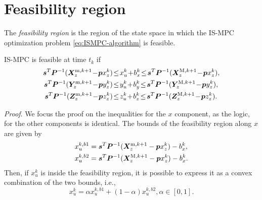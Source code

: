 \section{Feasibility region}

The {\em feasibility region} is the region of the state space in which the
IS-MPC optimization problem \eqref{eq:ISMPC-algorithm} is feasible.

\begin{proposition}
\label{prop:feasibility}
IS-MPC is feasible at time $t_k$ if
\begin{align}
\label{eq:FAPA:mpc-feasibility-constraint}
\bm{s}^T \bm{P}^{-1} (\bm{X}_z^{{\rm m}, k+1} \!-\! \bm{p} x_z^k)  \!&\le\! x_u^k \!+\! b_x^k \!\le\! \bm{s}^T \bm{P}^{-1} (\bm{X}_z^{{\rm M}, k+1} \!-\! \bm{p} x_z^k),
\nonumber\\
\bm{s}^T \bm{P}^{-1} (\bm{Y}_z^{{\rm m}, k+1} \!-\! \bm{p} y_z^k)  \!&\le\! y_u^k \!+\! b_y^k \!\le\! \bm{s}^T \bm{P}^{-1} (\bm{Y}_z^{{\rm M}, k+1} \!-\! \bm{p} y_z^k),
\nonumber\\
\bm{s}^T \bm{P}^{-1} (\bm{Z}_z^{{\rm m}, k+1} \!-\! \bm{p} z_z^k)  \!&\le\! z_u^k \!+\! b_z^k \!\le\! \bm{s}^T \bm{P}^{-1} (\bm{Z}_z^{{\rm M}, k+1} \!-\! \bm{p} z_z^k).
\end{align}
\end{proposition}
{\em Proof}.
We focus the proof on the inequalities for the $x$ component, as the logic, for
the other components is identical. The bounds of the feasibility region along
$x$ are given by
\begin{align*}
x_u^{k,b1} &= \bm{s}^T \bm{P}^{-1} (\bm{X}_z^{{\rm m}, k+1} - \bm{p} x_z^k) - b_x^k, \\
x_u^{k,b2} &= \bm{s}^T \bm{P}^{-1} (\bm{X}_z^{{\rm M}, k+1} - \bm{p} x_z^k) - b_x^k.
\end{align*}
Then, if $x_u^k$ is inside the feasibility region, it is possible to express
it as a convex combination of the two bounds, i.e.,
\begin{equation}\label{eq:FAPA:xu_convex}
x_u^k = \alpha x_u^{k,b1} + (1-\alpha)x_u^{k,b2}, \alpha \in [0, 1].
\end{equation}

